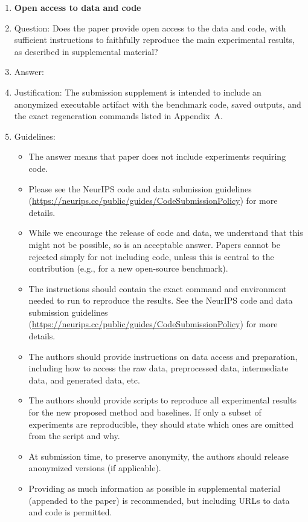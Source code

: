 \documentclass{article}
\begin{document}
\begin{enumerate}
\item {\bf Open access to data and code}
    \item[] Question: Does the paper provide open access to the data and code, with sufficient instructions to faithfully reproduce the main experimental results, as described in supplemental material?
    \item[] Answer: \answerYes{}
    \item[] Justification: The submission supplement is intended to include an anonymized executable artifact with the benchmark code, saved outputs, and the exact regeneration commands listed in Appendix~A.
    \item[] Guidelines:
    \begin{itemize}
        \item The answer \answerNA{} means that paper does not include experiments requiring code.
        \item Please see the NeurIPS code and data submission guidelines (\url{https://neurips.cc/public/guides/CodeSubmissionPolicy}) for more details.
        \item While we encourage the release of code and data, we understand that this might not be possible, so \answerNo{} is an acceptable answer. Papers cannot be rejected simply for not including code, unless this is central to the contribution (e.g., for a new open-source benchmark).
        \item The instructions should contain the exact command and environment needed to run to reproduce the results. See the NeurIPS code and data submission guidelines (\url{https://neurips.cc/public/guides/CodeSubmissionPolicy}) for more details.
        \item The authors should provide instructions on data access and preparation, including how to access the raw data, preprocessed data, intermediate data, and generated data, etc.
        \item The authors should provide scripts to reproduce all experimental results for the new proposed method and baselines. If only a subset of experiments are reproducible, they should state which ones are omitted from the script and why.
        \item At submission time, to preserve anonymity, the authors should release anonymized versions (if applicable).
        \item Providing as much information as possible in supplemental material (appended to the paper) is recommended, but including URLs to data and code is permitted.
    \end{itemize}


\end{enumerate}
\end{document}

